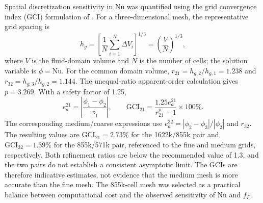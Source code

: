 Spatial discretization sensitivity in Nu was quantified using the grid convergence index (GCI) formulation of \citet{celik2008gci}. For a three-dimensional mesh, the representative grid spacing is
\[
h_g=\left[\frac{1}{N}\sum_{i=1}^{N}\Delta V_i\right]^{1/3}
=\left(\frac{V}{N}\right)^{1/3},
\]
where $V$ is the fluid-domain volume and $N$ is the number of cells; the solution variable is $\phi=\mathrm{Nu}$. For the common domain volume, $r_{21}=h_{g,2}/h_{g,1}=1.238$ and $r_{32}=h_{g,3}/h_{g,2}=1.144$. The unequal-ratio apparent-order calculation gives $p=3.269$. With a safety factor of 1.25,
\[
e_a^{21}=\left|\frac{\phi_1-\phi_2}{\phi_1}\right|,
\qquad
\mathrm{GCI}_{21}=\frac{1.25e_a^{21}}{r_{21}^{p}-1}\times100\%.
\]
The corresponding medium/coarse expressions use $e_a^{32}=|\phi_2-\phi_3|/|\phi_2|$ and $r_{32}$. The resulting values are $\mathrm{GCI}_{21}=2.73\%$ for the 1622k/855k pair and $\mathrm{GCI}_{32}=1.39\%$ for the 855k/571k pair, referenced to the fine and medium grids, respectively. Both refinement ratios are below the recommended value of 1.3, and the two pairs do not establish a consistent asymptotic limit. The GCIs are therefore indicative estimates, not evidence that the medium mesh is more accurate than the fine mesh. The 855k-cell mesh was selected as a practical balance between computational cost and the observed sensitivity of Nu and $f_F$.
